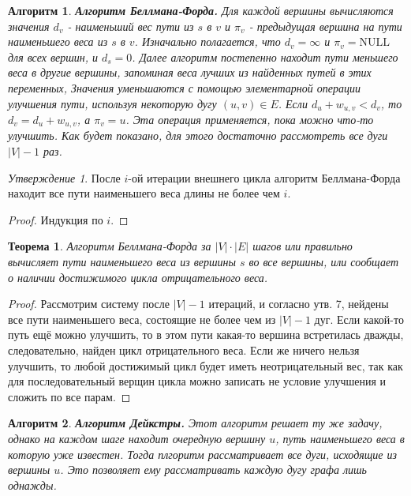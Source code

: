 \documentclass[a4paper]{article}
\theoremstyle{indented}
\newtheorem{theorem}{Теорема}
\newtheorem{alg}{Алгоритм}
\theoremstyle{definition}
\theoremstyle{remark}
\newtheorem{stat}{Утверждение}
\begin{document}
\begin{alg}
    \textbf{Алгоритм Беллмана-Форда.} Для каждой вершины вычисляются значения $d_v$ - наименьший вес пути из $s$ в $v$ и $\pi_v$ - предыдущая вершина на пути наименьшего веса из $s$ в $v$. Изначально полагается, что $d_v=\infty$ и $\pi_v=\text{NULL}$ для всех вершин, и $d_s=0$. Далее алгоритм постепенно находит пути меньшего веса в другие вершины, запоминая веса лучших из найденных путей в этих переменных, Значения уменьшаются с помощью элементарной операции улучшения пути, используя некоторую дугу $(u, v)\in E$. Если $d_u+w_{u, v}<d_v$, то $d_v=d_u+w_{u, v}$, а $\pi_v=u$. Эта операция применяется, пока можно что-то улучшить. Как будет показано, для этого достаточно рассмотреть все дуги $|V|-1$ раз.
\end{alg}

\begin{stat}
    После $i$-ой итерации внешнего цикла алгоритм Беллмана-Форда находит все пути наименьшего веса длины не более чем $i$. 
\end{stat}

\begin{proof}
    Индукция по $i$. 
\end{proof}

\begin{theorem}
    Алгоритм Беллмана-Форда за $|V|\cdot|E|$ шагов или правильно вычисляет пути наименьшего веса из вершины $s$ во все вершины, или сообщает о наличии достижимого цикла отрицательного веса. 
\end{theorem}

\begin{proof}
    Рассмотрим систему после $|V|-1$ итераций, и согласно утв. 7, нейдены все пути наименьшего веса, состоящие не более чем из $|V|-1$ дуг. Если какой-то путь ещё можно улучшить, то в этом пути какая-то вершина встретилась дважды, следовательно, найден цикл отрицательного веса. Если же ничего нельзя улучшить, то любой достижимый цикл будет иметь неотрицательный вес, так как для последовательный верщин цикла можно записать не условие улучшения и сложить по все парам.
\end{proof}

\begin{alg}
    \textbf{Алгоритм Дейкстры.} Этот алгоритм решает ту же задачу, однако на каждом шаге находит очередную вершину $u$, путь наименьшего веса в которую уже известен. Тогда плгоритм рассматривает все дуги, исходящие из вершины $u$. Это позволяет ему рассматривать каждую дугу графа лишь однажды.
\end{alg} \
\end{document}
